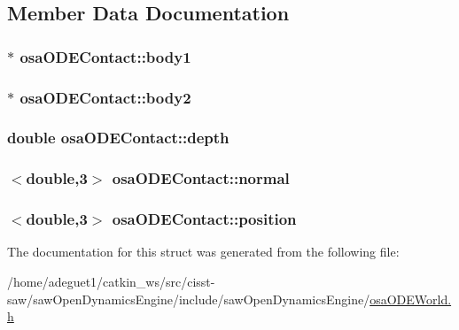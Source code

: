 \subsection{Member Data Documentation}
\hypertarget{structosa_o_d_e_contact_ae89beddf59923facc7abce1c1f9ce2a8}{
\subsubsection[{body1}]{$\ast$ osa\-O\-D\-E\-Contact\-::body1}}\label{structosa_o_d_e_contact_ae89beddf59923facc7abce1c1f9ce2a8}
\hypertarget{structosa_o_d_e_contact_a1148b4a03a82bf9f7155b4e7a7536739}{
\subsubsection[{body2}]{$\ast$ osa\-O\-D\-E\-Contact\-::body2}}\label{structosa_o_d_e_contact_a1148b4a03a82bf9f7155b4e7a7536739}
\hypertarget{structosa_o_d_e_contact_a6c133096ca9fd520047a636656c50126}{
\subsubsection[{depth}]{\setlength{\rightskip}{0pt plus 5cm}double osa\-O\-D\-E\-Contact\-::depth}}\label{structosa_o_d_e_contact_a6c133096ca9fd520047a636656c50126}
\hypertarget{structosa_o_d_e_contact_a13e7c6b7b860f7b0744121d413929807}{
\subsubsection[{normal}]{$<$double,3$>$ osa\-O\-D\-E\-Contact\-::normal}}\label{structosa_o_d_e_contact_a13e7c6b7b860f7b0744121d413929807}
\hypertarget{structosa_o_d_e_contact_aec71f90b8053631cb8d51b2eb375a266}{
\subsubsection[{position}]{$<$double,3$>$ osa\-O\-D\-E\-Contact\-::position}}\label{structosa_o_d_e_contact_aec71f90b8053631cb8d51b2eb375a266}


The documentation for this struct was generated from the following file\-:\begin{DoxyCompactItemize}
\item 
/home/adeguet1/catkin\-\_\-ws/src/cisst-\/saw/saw\-Open\-Dynamics\-Engine/include/saw\-Open\-Dynamics\-Engine/\hyperlink{osa_o_d_e_world_8h}{osa\-O\-D\-E\-World.\-h}\end{DoxyCompactItemize}
